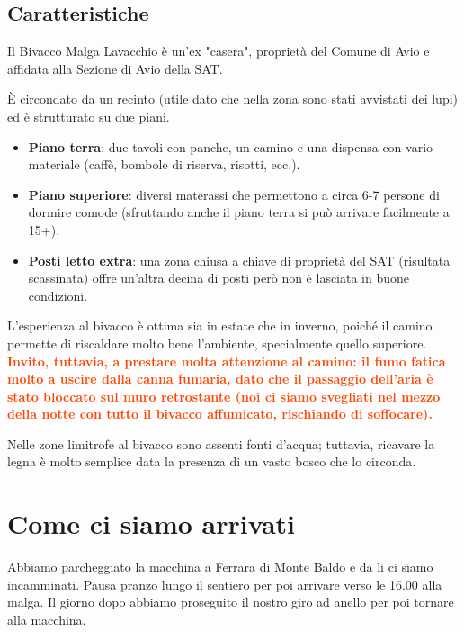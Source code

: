 \documentclass{article}
\begin{document}
\subsection{Caratteristiche}
Il Bivacco Malga Lavacchio è un'ex "casera", proprietà del Comune di Avio e affidata alla Sezione di Avio della SAT.

È circondato da un recinto (utile dato che nella zona sono stati avvistati dei lupi) ed è strutturato su due piani.
\begin{itemize}
    \item \textbf{Piano terra}: due tavoli con panche, un camino e una dispensa con vario materiale (caffè, bombole di riserva, risotti, ecc.).
    \item \textbf{Piano superiore}: diversi materassi che permettono a circa 6-7 persone di dormire comode (sfruttando anche il piano terra si può arrivare facilmente a 15+).
    \item \textbf{Posti letto extra}: una zona chiusa a chiave di proprietà del SAT (risultata scassinata) offre un'altra decina di posti però non è lasciata in buone condizioni.
\end{itemize}

L'esperienza al bivacco è ottima sia in estate che in inverno, poiché il camino permette di riscaldare molto bene l'ambiente, specialmente quello superiore. \textbf{\textcolor{OrangeRed}{Invito, tuttavia, a prestare molta attenzione al camino: il fumo fatica molto a uscire dalla canna fumaria, dato che il passaggio dell'aria è stato bloccato sul muro retrostante (noi ci siamo svegliati nel mezzo della notte con tutto il bivacco affumicato, rischiando di soffocare).}}

Nelle zone limitrofe al bivacco sono assenti fonti d'acqua; tuttavia, ricavare la legna è molto semplice data la presenza di un vasto bosco che lo circonda.

\section{Come ci siamo arrivati}
Abbiamo parcheggiato la macchina a \href{https://maps.google.com/?q=45.676406324779414,10.854469948453458}{Ferrara di Monte Baldo} e da li ci siamo incamminati. Pausa pranzo lungo il sentiero per poi arrivare verso le 16.00 alla malga. Il giorno dopo abbiamo proseguito il nostro giro ad anello per poi tornare alla macchina.
\end{document}
